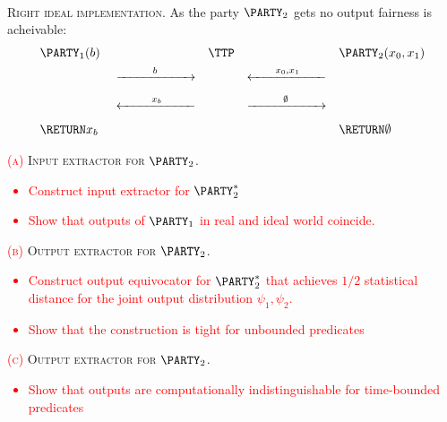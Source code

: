 \documentclass{crypto-exercise}
\begin{document}
\begin{solution}
\ \\
\textsc{Right ideal implementation.}
As the party $\PARTY_2$ gets no output fairness is acheivable:
\begin{align*}
&\PARTY_1(b) &&&& \TTP  &&&&\PARTY_2(x_0, x_1) \\
&&&\xrightarrow[\hspace*{2cm}]{b}
&&&\xleftarrow[\hspace*{2cm}]{x_0,x_1}\\
&&&\xleftarrow[\hspace*{2cm}]{x_b}
&&&\xrightarrow[\hspace*{2cm}]{\emptyset}\\
&\RETURN x_b
&&&&&&&&\RETURN \emptyset
\end{align*}

\noindent
\textsc{\textcolor{red}{(a)} Input extractor for $\PARTY_2$.}
\textcolor{red}{
\begin{itemize}
\item Construct input extractor for $\PARTY_2^*$ 
\item Show that outputs of $\PARTY_1$ in real and ideal world coincide. 
\end{itemize}}

\noindent
\textsc{\textcolor{red}{(b)} Output extractor for $\PARTY_2$.}
\textcolor{red}{
\begin{itemize}
\item Construct output equivocator for $\PARTY_2^*$ that achieves $1/2$ statistical distance for the joint output distribution $\psi_1, \psi_2$.
\item Show that the construction is tight for unbounded predicates 
\end{itemize}}

\noindent
\textsc{\textcolor{red}{(c)} Output extractor for $\PARTY_2$.}
\textcolor{red}{
\begin{itemize}
\item Show that outputs are computationally indistinguishable for time-bounded predicates
\end{itemize}}

\end{solution}
\end{document}
